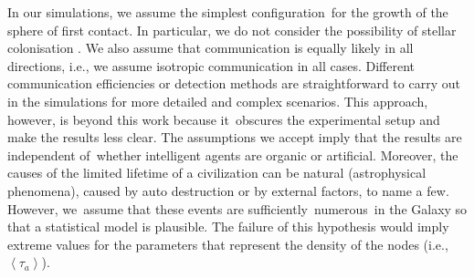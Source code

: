 \documentclass[crop]{CSLB}
\begin{document}
In our simulations, we assume the simplest configuration for the
growth of the sphere of first contact.
%
In particular, we do not consider the
possibility of stellar colonisation
\citep[e.g.][]{newman_galactic_1981, walters_interstellar_1980,
starling_virulence_2013, barlow_galactic_2012, jeong_large_2000,
maccone_mathematical_2011}.
%
We also assume that communication is
equally likely in all directions, i.e., we assume isotropic
communication in all cases.
%
Different communication efficiencies or
detection methods are straightforward to carry out in the simulations
for more detailed and complex scenarios.
%
This approach, however, is
beyond this work because it obscures the experimental setup and make
the results less clear.
%
The assumptions we accept imply that the
results are independent of whether intelligent agents are organic or
artificial. Moreover, the causes of the limited lifetime of a
civilization can be natural (astrophysical phenomena), caused by auto
destruction or by external factors, to name a few. However, we assume
that these events are sufficiently numerous in the Galaxy so that a
statistical model is plausible. The failure of this hypothesis would
imply extreme values for the parameters that represent the density of
the nodes (i.e., $\left< \tau_a \right>$).





\end{document}
